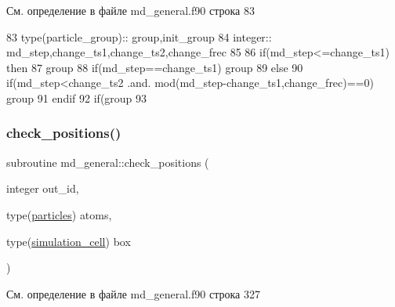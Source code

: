 См. определение в файле md\+\_\+general.\+f90 строка 83


\begin{DoxyCode}
83     \textcolor{keywordtype}{type}(particle\_group)::  group,init\_group
84     \textcolor{keywordtype}{integer}:: md\_step,change\_ts1,change\_ts2,change\_frec
85 
86     \textcolor{keywordflow}{if}(md\_step<=change\_ts1) \textcolor{keywordflow}{then}
87         group%
88         \textcolor{keywordflow}{if}(md\_step==change\_ts1) group%
89     \textcolor{keywordflow}{else}
90         \textcolor{keywordflow}{if}(md\_step<change\_ts2 .and. mod(md\_step-change\_ts1,change\_frec)==0) group%
91 \textcolor{keywordflow}{    endif}
92     \textcolor{keywordflow}{if}(group%
93     
\end{DoxyCode}
\mbox{\label{namespacemd__general_ac9e62480edf60d2b3d1a123c9da68e1f}} 
\subsubsection{\texorpdfstring{check\+\_\+positions()}{check\_positions()}}
{\footnotesize\ttfamily subroutine md\+\_\+general\+::check\+\_\+positions (\begin{DoxyParamCaption}\item[{integer}]{out\+\_\+id,  }\item[{type(\mbox{\hyperlink{structmd__general_1_1particles}{particles}})}]{atoms,  }\item[{type(\mbox{\hyperlink{structmd__general_1_1simulation__cell}{simulation\+\_\+cell}})}]{box }\end{DoxyParamCaption})}



См. определение в файле md\+\_\+general.\+f90 строка 327


